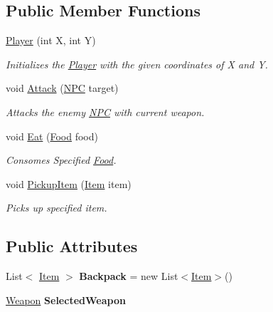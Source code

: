 \subsection*{Public Member Functions}
\begin{DoxyCompactItemize}
\item 
\mbox{\hyperlink{class_roguelike_r_p_g_1_1_player_a998f3a9a1b1849f460689ec87ce14b72}{Player}} (int X, int Y)
\begin{DoxyCompactList}\small\item\em Initializes the \mbox{\hyperlink{class_roguelike_r_p_g_1_1_player}{Player}} with the given coordinates of X and Y. \end{DoxyCompactList}\item 
void \mbox{\hyperlink{class_roguelike_r_p_g_1_1_player_ac0ed6040b097a55a18e19ee9e604f5de}{Attack}} (\mbox{\hyperlink{class_roguelike_r_p_g_1_1_n_p_c}{N\+PC}} target)
\begin{DoxyCompactList}\small\item\em Attacks the enemy \mbox{\hyperlink{class_roguelike_r_p_g_1_1_n_p_c}{N\+PC}} with current weapon. \end{DoxyCompactList}\item 
void \mbox{\hyperlink{class_roguelike_r_p_g_1_1_player_ae8cdb59fd33dbc6f1b8cc3c17f15908e}{Eat}} (\mbox{\hyperlink{class_roguelike_r_p_g_1_1_food}{Food}} food)
\begin{DoxyCompactList}\small\item\em Consomes Specified \mbox{\hyperlink{class_roguelike_r_p_g_1_1_food}{Food}}. \end{DoxyCompactList}\item 
void \mbox{\hyperlink{class_roguelike_r_p_g_1_1_player_a9851fb6d029e554484fc11bb345b1632}{Pickup\+Item}} (\mbox{\hyperlink{class_roguelike_r_p_g_1_1_item}{Item}} item)
\begin{DoxyCompactList}\small\item\em Picks up specified item. \end{DoxyCompactList}\end{DoxyCompactItemize}
\subsection*{Public Attributes}
\begin{DoxyCompactItemize}
\item 
\mbox{\label{class_roguelike_r_p_g_1_1_player_a193007784493dc32f358c748194a9232}} 
List$<$ \mbox{\hyperlink{class_roguelike_r_p_g_1_1_item}{Item}} $>$ {\bfseries Backpack} = new List$<$\mbox{\hyperlink{class_roguelike_r_p_g_1_1_item}{Item}}$>$()
\item 
\mbox{\label{class_roguelike_r_p_g_1_1_player_ac63a134363b5f4f73cb1cdd214be81b1}} 
\mbox{\hyperlink{class_roguelike_r_p_g_1_1_weapon}{Weapon}} {\bfseries Selected\+Weapon}
\end{DoxyCompactItemize}
